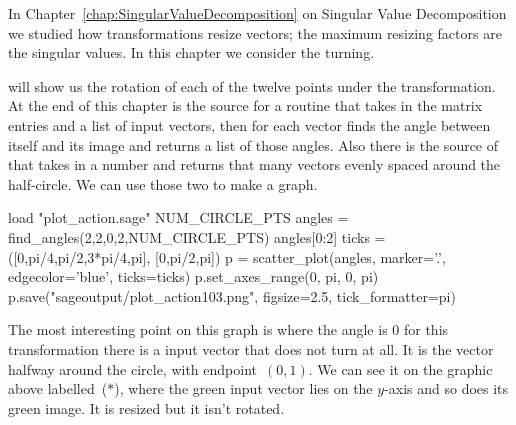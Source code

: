 In Chapter~\ref{chap:SingularValueDecomposition} on 
Singular Value Decomposition we studied how
transformations resize vectors; the maximum resizing factors
are the singular values.
In this chapter we consider the turning.

\Sage{} will show us the rotation of each of the twelve points 
under the transformation.
At the end of this chapter is the source for a routine 
that takes in the matrix entries and a list of input vectors, then
for each vector finds the angle between itself and its image and
returns a list of those angles.
Also there is the source of  that takes in a
number and returns that many vectors evenly spaced around the half-circle. 
We can use those two to make a graph.
\begin{sageoutput}[d,0,1]
load "plot_action.sage"  
NUM_CIRCLE_PTS
angles = find_angles(2,2,0,2,NUM_CIRCLE_PTS)
angles[0:2]
ticks = ([0,pi/4,pi/2,3*pi/4,pi], [0,pi/2,pi])
p = scatter_plot(angles, marker='.', edgecolor='blue', ticks=ticks)
p.set_axes_range(0, pi, 0, pi) 
p.save("sageoutput/plot_action103.png", figsize=2.5, tick_formatter=pi)
\end{sageoutput}
\begin{center}
\end{center}
The most interesting point on this graph is where the angle is $0$\Dash
for this transformation there is a input vector that does not turn at all.
It is the vector halfway around the circle, with endpoint~$(0,1)$. 
We can see it on the graphic above labelled~($*$), where the green input
vector lies on the $y$-axis and so does its green image.
It is resized but it isn't rotated.



